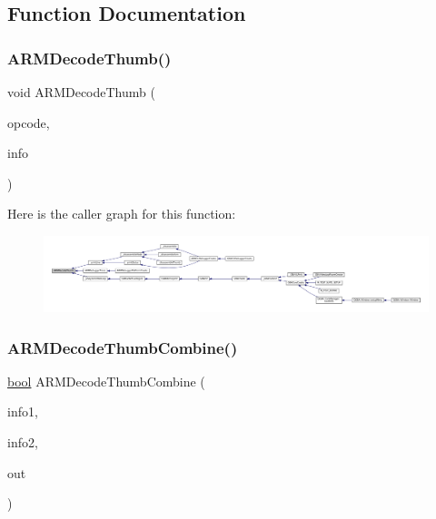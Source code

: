 \subsection{Function Documentation}
\mbox{\label{decoder-thumb_8c_aec279e7154b44fcbabd3c092e0d24add}} 
\subsubsection{\texorpdfstring{A\+R\+M\+Decode\+Thumb()}{ARMDecodeThumb()}}
{\footnotesize\ttfamily void A\+R\+M\+Decode\+Thumb (\begin{DoxyParamCaption}\item[{uint16\+\_\+t}]{opcode,  }\item[{struct A\+R\+M\+Instruction\+Info $\ast$}]{info }\end{DoxyParamCaption})}

Here is the caller graph for this function\+:
\nopagebreak
\begin{figure}[H]
\begin{center}
\leavevmode
\includegraphics[width=350pt]{decoder-thumb_8c_aec279e7154b44fcbabd3c092e0d24add_icgraph}
\end{center}
\end{figure}
\mbox{\label{decoder-thumb_8c_ae170fe1498e80cd159ab197c56da10c6}} 
\subsubsection{\texorpdfstring{A\+R\+M\+Decode\+Thumb\+Combine()}{ARMDecodeThumbCombine()}}
{\footnotesize\ttfamily \mbox{\hyperlink{libretro_8h_a4a26dcae73fb7e1528214a068aca317e}{bool}} A\+R\+M\+Decode\+Thumb\+Combine (\begin{DoxyParamCaption}\item[{struct A\+R\+M\+Instruction\+Info $\ast$}]{info1,  }\item[{struct A\+R\+M\+Instruction\+Info $\ast$}]{info2,  }\item[{struct A\+R\+M\+Instruction\+Info $\ast$}]{out }\end{DoxyParamCaption})}

